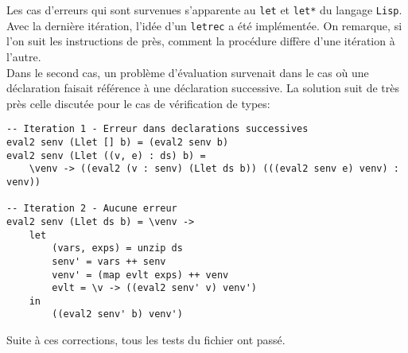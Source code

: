 \documentclass[11pt, titlepage]{article}
\begin{document}
Les cas d'erreurs qui sont survenues s'apparente au \texttt{let} et
\texttt{let*} du langage \texttt{Lisp}. Avec la dernière itération, l'idée d'un
\texttt{letrec} a été implémentée. On remarque, si l'on suit les instructions
de près, comment la procédure diffère d'une itération à l'autre. \\

Dans le second cas, un problème d'évaluation survenait dans le cas où une
déclaration faisait référence à une déclaration successive. La solution suit de
très près celle discutée pour le cas de vérification de types:

\begin{lstlisting}
-- Iteration 1 - Erreur dans declarations successives
eval2 senv (Llet [] b) = (eval2 senv b)
eval2 senv (Llet ((v, e) : ds) b) =
    \venv -> ((eval2 (v : senv) (Llet ds b)) (((eval2 senv e) venv) : venv))

-- Iteration 2 - Aucune erreur
eval2 senv (Llet ds b) = \venv ->
    let
        (vars, exps) = unzip ds
        senv' = vars ++ senv
        venv' = (map evlt exps) ++ venv
        evlt = \v -> ((eval2 senv' v) venv')
    in
        ((eval2 senv' b) venv')
\end{lstlisting}

Suite à ces corrections, tous les tests du fichier ont passé.
\end{document}
